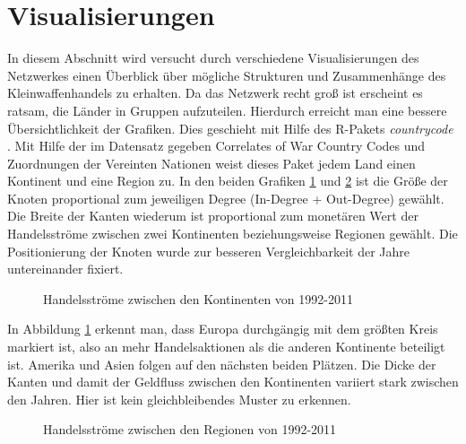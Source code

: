 \documentclass[a4paper,ngerman,oneside,titlepage,bibliography=totoc,11pt]{scrreprt}
\begin{document}

\newpage
\section{Visualisierungen}

In diesem Abschnitt wird versucht durch verschiedene Visualisierungen des Netzwerkes einen Überblick über mögliche Strukturen und Zusammenhänge des Kleinwaffenhandels zu erhalten. Da das Netzwerk recht groß ist erscheint es ratsam, die Länder in Gruppen aufzuteilen. Hierdurch erreicht man eine bessere Übersichtlichkeit der Grafiken. Dies geschieht mit Hilfe des R-Pakets \emph{countrycode} \cite{countrycode}. Mit Hilfe der im Datensatz gegeben Correlates of War Country Codes und Zuordnungen der Vereinten Nationen weist dieses Paket jedem Land einen Kontinent und eine Region zu. In den beiden Grafiken \ref{fig:cont} und \ref{fig:reg} ist die Größe der Knoten proportional zum jeweiligen Degree (In-Degree + Out-Degree) gewählt. Die Breite der Kanten wiederum ist proportional zum monetären Wert der Handelsströme zwischen zwei Kontinenten beziehungsweise Regionen gewählt. Die Positionierung der Knoten wurde zur besseren Vergleichbarkeit der Jahre untereinander fixiert.

\begin{figure}[ht]
\centering
{}
\caption{Handelsströme zwischen den Kontinenten von 1992-2011}
\label{fig:cont}
\end{figure}

In Abbildung \ref{fig:cont} erkennt man, dass Europa durchgängig mit dem größten Kreis markiert ist, also an mehr Handelsaktionen als die anderen Kontinente beteiligt ist. Amerika und Asien folgen auf den nächsten beiden Plätzen. Die Dicke der Kanten und damit der Geldfluss zwischen den Kontinenten variiert stark zwischen den Jahren. Hier ist kein gleichbleibendes Muster zu erkennen.

\begin{figure}[ht]
\centering
{}
\caption{Handelsströme zwischen den Regionen von 1992-2011}
\label{fig:reg}
\end{figure}
\end{document}
